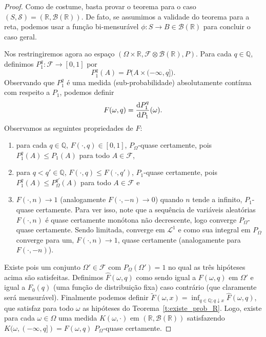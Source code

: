 \begin{proof}
  Como de costume, basta provar o teorema para o caso $(S, \mathcal{S}) = (\mathbb{R}, \mathcal{B}(\mathbb{R}))$.
  De fato, se assumimos a validade do teorema para a reta, podemos usar a função bi-mensurável $\phi: S \to B \in \mathcal{B}(\mathbb{R})$ para concluir o caso geral.

  Nos restringiremos agora ao espaço $(\Omega \times \mathbb{R}, \mathcal{F} \otimes \mathcal{B}(\mathbb{R}), P)$.
  Para cada $q \in \mathbb{Q}$, definimos $P^q_1 : \mathcal{F} \to [0,1]$ por
  \begin{equation}
    P^q_1 (A) = P \big( A  \times (-\infty, q] \big).
  \end{equation}
  Observando que $P^q_1$ é uma medida (sub-probabilidade) absolutamente contínua com respeito a $P_1$, podemos definir
  \begin{equation}
    F(\omega, q) = \frac{\mathop{}\!\mathrm{d} P^q_1}{\mathop{}\!\mathrm{d} P_1}(\omega).
  \end{equation}
  Observamos as seguintes propriedades de $F$:
  \begin{enumerate}[\quad a)]
  \item para cada $q \in \mathbb{Q}$, $F(\cdot, q) \in [0,1]$, $P_\Omega$-quase certamente, pois $P^q_1(A) \leq P_1(A)$ para todo $A \in \mathcal{F}$,
  \item para $q < q' \in \mathbb{Q}$, $F(\cdot, q) \leq F(\cdot, q')$, $P_1$-quase certamente, pois $P^q_1(A) \leq P^{q'}_\Omega(A)$ para todo $A \in \mathcal{F}$ e
  \item $F(\cdot, n) \to 1$ (analogamente $F(\cdot, -n) \to 0$) quando $n$ tende a infinito, $P_1$-quase certamente.
    Para ver isso, note que a sequência de variáveis aleatórias $F(\cdot, n)$ é quase certamente monótona não decrescente, logo converge $P_\Omega$-quase certamente.
    Sendo limitada, converge em $\mathcal{L}^1$ e como sua integral em $P_\Omega$ converge para um, $F(\cdot, n) \to 1$, quase certamente (analogamente para $F(\cdot, -n)$).
  \end{enumerate}
  Existe pois um conjunto $\Omega' \in \mathcal{F}$ com $P_\Omega(\Omega') = 1$ no qual as três hipóteses acima são satisfeitas.
  Definimos $\hat{F}(\omega, q)$ como sendo igual a $F(\omega, q)$ em $\Omega'$ e igual a $F_0(q)$ (uma função de distribuição fixa) caso contrário (que claramente será mensurável).
  Finalmente podemos definir $\tilde{F}(\omega, x) = \inf_{q \in \mathbb{Q}; q \downarrow x} \hat{F}(\omega, q)$, que satisfaz para todo $\omega$ as hipóteses do Teorema~\ref{t:existe_prob_R}.
  Logo, existe para cada $\omega \in \Omega$ uma medida $K(\omega, \cdot)$ em $(\mathbb{R}, \mathcal{B}(\mathbb{R}))$ satisfazendo $K(\omega,(-\infty, q]) = F(\omega, q)$ $P_\Omega$-quase certamente.


\end{proof}
